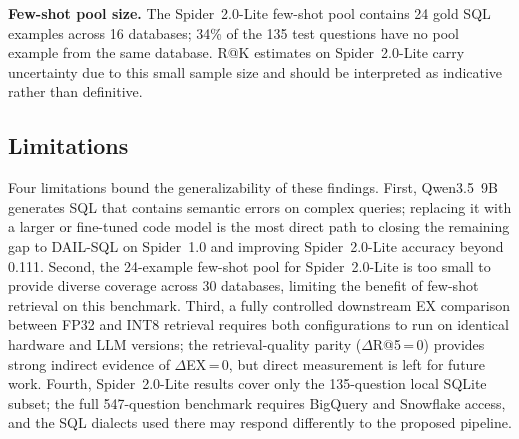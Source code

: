 \textbf{Few-shot pool size.}
The Spider~2.0-Lite few-shot pool contains 24 gold SQL examples across
16 databases; 34\% of the 135 test questions have no pool example from
the same database.
R@K estimates on Spider~2.0-Lite carry uncertainty due to this small
sample size and should be interpreted as indicative rather than definitive.

\subsection{Limitations}

Four limitations bound the generalizability of these findings.
First, Qwen3.5~9B generates SQL that contains semantic errors on complex
queries; replacing it with a larger or fine-tuned code model is the most
direct path to closing the remaining gap to DAIL-SQL on Spider~1.0 and
improving Spider~2.0-Lite accuracy beyond 0.111.
Second, the 24-example few-shot pool for Spider~2.0-Lite is too small to
provide diverse coverage across 30 databases, limiting the benefit of
few-shot retrieval on this benchmark.
Third, a fully controlled downstream EX comparison between FP32 and INT8
retrieval requires both configurations to run on identical hardware and
LLM versions; the retrieval-quality parity ($\Delta$R@5\,=\,0) provides
strong indirect evidence of $\Delta$EX\,=\,0, but direct measurement is
left for future work.
Fourth, Spider~2.0-Lite results cover only the 135-question local SQLite
subset; the full 547-question benchmark requires BigQuery and Snowflake
access, and the SQL dialects used there may respond differently to the
proposed pipeline.
